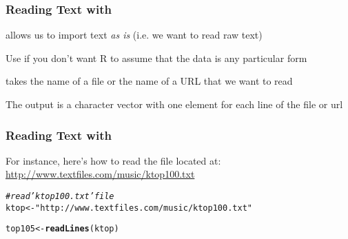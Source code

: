 \documentclass[12pt]{beamer}\usepackage[]{graphicx}\usepackage[]{color}
\makeatletter
\newcommand{\hlstr}[1]{\textcolor[rgb]{0.192,0.494,0.8}{#1}}%
\newcommand{\hlcom}[1]{\textcolor[rgb]{0.678,0.584,0.686}{\textit{#1}}}%
\newcommand{\hlstd}[1]{\textcolor[rgb]{0.345,0.345,0.345}{#1}}%
\newcommand{\hlkwb}[1]{\textcolor[rgb]{0.69,0.353,0.396}{#1}}%
\newcommand{\hlkwd}[1]{\textcolor[rgb]{0.737,0.353,0.396}{\textbf{#1}}}%
\newenvironment{kframe}{%
 \def\at@end@of@kframe{}%
 \ifinner\ifhmode%
  \def\at@end@of@kframe{\end{minipage}}%
  \begin{minipage}{\columnwidth}%
 \fi\fi%
 \def\FrameCommand##1{\hskip\@totalleftmargin \hskip-\fboxsep
 \colorbox{shadecolor}{##1}\hskip-\fboxsep
     \hskip-\linewidth \hskip-\@totalleftmargin \hskip\columnwidth}%
 \MakeFramed {\advance\hsize-\width
   \@totalleftmargin\z@ \linewidth\hsize
   \@setminipage}}%
 {\par\unskip\endMakeFramed%
 \at@end@of@kframe}
\newenvironment{knitrout}{}{} %
\makeatother
\begin{document}

\begin{frame}
\begin{center}
\Huge{}
\end{center}
\end{frame}


\begin{frame}
\frametitle{Reading Text with }

\bi
  \item {\hilit {}} allows us to import text \textit{as is} (i.e. we want to read raw text)
  \item Use  if you don't want R to assume that the data is any particular form
  \item {} takes the name of a file or the name of a URL that we want to read
  \item The output is a character vector with one element for each line of the file or url
\ei
  
\end{frame}


\begin{frame}[fragile]
\frametitle{Reading Text with }

For instance, here's how to read the file located at: \\
\url{http://www.textfiles.com/music/ktop100.txt}



\begin{knitrout}\footnotesize
{}\color{fgcolor}\begin{kframe}
\begin{alltt}
\hlcom{# read 'ktop100.txt' file}
\hlstd{ktop} \hlkwb{<-} \hlstr{"http://www.textfiles.com/music/ktop100.txt"}

\hlstd{top105} \hlkwb{<-} \hlkwd{readLines}\hlstd{(ktop)}
\end{alltt}
\end{kframe}
\end{knitrout}
  
\end{frame}

\end{document}
